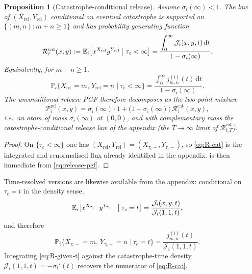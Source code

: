 \documentclass[11pt]{article}
\newcommand{\Prob}{\mathbb P}
\newcommand{\E}{\mathbb E}
\newcommand{\dd}{\mathrm d}
\newcommand{\Xrel}{X_{\mathrm{rel}}}
\newcommand{\Yrel}{Y_{\mathrm{rel}}}
\theoremstyle{plain}
\newtheorem{proposition}{Proposition}
\theoremstyle{definition}
\theoremstyle{remark}
\begin{document}
\begin{proposition}[Catastrophe-conditional release]
\label{prop:conditional}
Assume $\sigma_i(\infty)<1$. The law of $(\Xrel,\Yrel)$ conditional on eventual catastrophe is
supported on $\{(m,n):m+n\ge 1\}$ and has probability generating function
\begin{equation}
\label{eq:R-cat}
\mathcal R_i^{\mathrm{cat}}(x,y)
:=
\E_i\bigl[
x^{\Xrel}y^{\Yrel}
\bigm|
\tau_c<\infty
\bigr]
=
\frac{
\displaystyle
\int_0^\infty
\mathcal J_i(x,y,t)\,
\dd t
}{
1-\sigma_i(\infty)
}.
\end{equation}
Equivalently, for $m+n\ge 1$,
\begin{equation}
\label{eq:conditional-pmf}
\Prob_i\{\Xrel=m,\,\Yrel=n\mid\tau_c<\infty\}
=
\frac{
\displaystyle
\int_0^\infty j_{m,n}^{(i)}(t)\,\dd t
}{
1-\sigma_i(\infty)
}.
\end{equation}
The unconditional release PGF therefore decomposes as the two-point mixture
\begin{equation}
\label{eq:mixture}
\mathcal P_i^{\mathrm{rel}}(x,y)
=
\sigma_i(\infty)
\cdot 1
+
\bigl(1-\sigma_i(\infty)\bigr)\,
\mathcal R_i^{\mathrm{cat}}(x,y),
\end{equation}
i.e.\ an atom of mass $\sigma_i(\infty)$ at $(0,0)$, and with complementary mass the
catastrophe-conditional release law of the appendix (the $T\to\infty$ limit of
$\mathcal R_{i,T}^{\mathrm{cat}}$).
\end{proposition}

\begin{proof}
On $\{\tau_c<\infty\}$ one has $(\Xrel,\Yrel)=(X_{\tau_c-},Y_{\tau_c-})$, so
\cref{eq:R-cat} is the integrated and renormalised flux already identified in the appendix.
 is then immediate from \cref{eq:release-pgf}.
\end{proof}

Time-resolved versions are likewise available from the appendix: conditional on
$\tau_c=t$ in the density sense,
\begin{equation}
\label{eq:R-given-t}
\E_i\bigl[
x^{X_{\tau_c-}}y^{Y_{\tau_c-}}
\bigm|
\tau_c=t
\bigr]
=
\frac{\mathcal J_i(x,y,t)}{\mathcal J_i(1,1,t)},
\end{equation}
and therefore
\begin{equation}
\label{eq:pmf-given-t}
\Prob_i\{X_{\tau_c-}=m,\,Y_{\tau_c-}=n\mid\tau_c=t\}
=
\frac{j_{m,n}^{(i)}(t)}{\mathcal J_i(1,1,t)}.
\end{equation}
Integrating \cref{eq:R-given-t} against the catastrophe-time density
$\mathcal J_i(1,1,t)=-\sigma_i'(t)$ recovers the numerator of \cref{eq:R-cat}.
\end{document}
